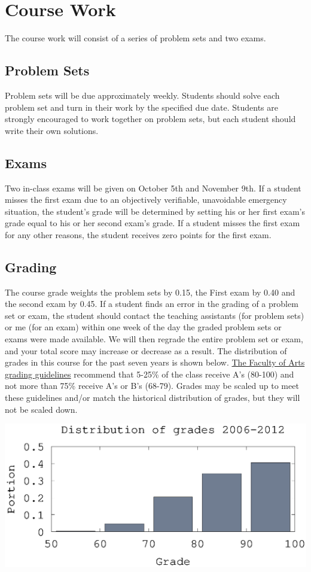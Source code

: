 \documentclass[10pt]{article}
\begin{document}
\section{Course Work}

The course work will consist of a series of problem sets and two
exams. 

\subsection{Problem Sets}
Problem sets will be due approximately weekly.  Students should solve
each problem set and turn in their work by the specified due
date. Students are strongly encouraged to work together on problem
sets, but each student should write their own solutions.

\subsection{Exams}
Two in-class exams will be given on October 5th and November 9th. If
a student misses the first exam due to an objectively verifiable,
unavoidable emergency situation, the student's grade will be
determined by setting his or her first exam's grade equal to his or her
second exam's grade. If a student misses the first exam for any other
reasons, the student receives zero points for the first exam.

\subsection{Grading}
The course grade weights the problem sets by 0.15, the First exam by
0.40 and the second exam by 0.45. If a student finds an error in the
grading of a problem set or exam, the student should contact the
teaching assistants (for problem sets) or me (for an exam) within one
week of the day the graded problem sets or exams were made
available. We will then regrade the entire problem set or exam, and
your total score may increase or decrease as a result.  The
distribution of grades in this course for the past seven years is shown
below.
\href{http://www.arts.ubc.ca/faculty-amp-staff/resources/courses-and-grading/grading-guidelines.html}
{The Faculty of Arts grading guidelines} recommend that 5-25\% of the
class receive A's (80-100) and not more than 75\% receive A's or B's
(68-79). Grades may be scaled up to meet these guidelines and/or match
the historical distribution of grades, but they will not be scaled
down. 

\begin{centering}
  \includegraphics[width=0.8\linewidth]{526gradeDist}
\end{centering}
\end{document}
